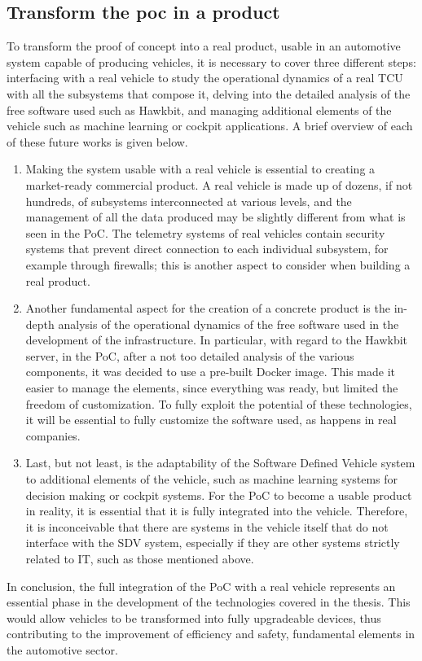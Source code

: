 \subsection{Transform the poc in a product}
To transform the proof of concept into a real product, usable in an automotive system capable of producing vehicles, it is necessary to cover three different steps: interfacing with a real vehicle to study the operational dynamics of a real TCU with all the subsystems that compose it, delving into the detailed analysis of the free software used such as Hawkbit, and managing additional elements of the vehicle such as machine learning or cockpit applications. A brief overview of each of these future works is given below.
\begin{enumerate}
    \item Making the system usable with a real vehicle is essential to creating a market-ready commercial product. A real vehicle is made up of dozens, if not hundreds, of subsystems interconnected at various levels, and the management of all the data produced may be slightly different from what is seen in the PoC. The telemetry systems of real vehicles contain security systems that prevent direct connection to each individual subsystem, for example through firewalls; this is another aspect to consider when building a real product.
    \item Another fundamental aspect for the creation of a concrete product is the in-depth analysis of the operational dynamics of the free software used in the development of the infrastructure. In particular, with regard to the Hawkbit server, in the PoC, after a not too detailed analysis of the various components, it was decided to use a pre-built Docker image. This made it easier to manage the elements, since everything was ready, but limited the freedom of customization. To fully exploit the potential of these technologies, it will be essential to fully customize the software used, as happens in real companies.
    \item Last, but not least, is the adaptability of the Software Defined Vehicle system to additional elements of the vehicle, such as machine learning systems for decision making or cockpit systems. For the PoC to become a usable product in reality, it is essential that it is fully integrated into the vehicle. Therefore, it is inconceivable that there are systems in the vehicle itself that do not interface with the SDV system, especially if they are other systems strictly related to IT, such as those mentioned above.  
\end{enumerate}

In conclusion, the full integration of the PoC with a real vehicle represents an essential phase in the development of the technologies covered in the thesis. This would allow vehicles to be transformed into fully upgradeable devices, thus contributing to the improvement of efficiency and safety, fundamental elements in the automotive sector.